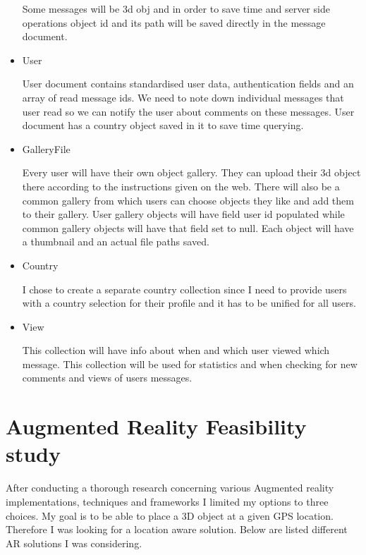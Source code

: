 \documentclass[thesis=M,english]{FITthesis}[2012/10/20]
\begin{document}
\begin{itemize}
Some messages will be 3d obj and in order to save time and server side operations object id and its path will be saved directly in the message document.

\item User

User document contains standardised user data, authentication fields and an array of read message ids. We need to note down individual messages that user read so we can notify the user about comments on these messages. User document has a country object saved in it to save time querying. 

\item GalleryFile

Every user will have their own object gallery. They can upload their 3d object there according to the instructions given on the web. There will also be a common gallery from which users can choose objects they like and add them to their gallery. User gallery objects will have field user id populated while common gallery objects will have that field set to null. Each object will have a thumbnail and an actual file paths saved.

\item Country

I chose to create a separate country collection since I need to provide users with a country selection for their profile and it has to be unified for all users.

\item View

This collection will have info about when and which user viewed which message. This collection will be used for statistics and when checking for new comments and views of users messages.

\end{itemize}


\section{Augmented Reality Feasibility study}
\label{section:ar}

After conducting a thorough research concerning various Augmented reality implementations, techniques and frameworks I limited my options to three choices. My goal is to be able to place a 3D object at a given GPS location. Therefore I was looking for a location aware solution. Below are listed different AR solutions I was considering.
\end{document}
